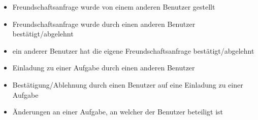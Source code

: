 \begin{itemize}
\setlength{\itemsep}{0pt}%
\setlength{\parskip}{0pt}%
\item Freundschaftsanfrage wurde von einem anderen Benutzer gestellt
\item Freundschaftsanfrage wurde durch einen anderen Benutzer bestätigt/abgelehnt
\item ein anderer Benutzer hat die eigene Freundschaftsanfrage bestätigt/abgelehnt
\item Einladung zu einer Aufgabe durch einen anderen Benutzer
\item Bestätigung/Ablehnung durch einen Benutzer auf eine Einladung zu einer Aufgabe
\item Änderungen an einer Aufgabe, an welcher der Benutzer beteiligt ist
\end{itemize}

